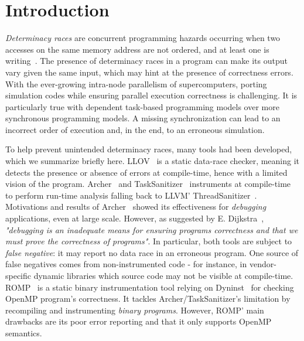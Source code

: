\section{Introduction}


\emph{Determinacy races} are concurrent programming hazards occurring when two accesses on the same memory address are not ordered, and at least one is writing~\cite{determinator}.
The presence of determinacy races in a program can make its output vary given the same input, which may hint at the presence of correctness errors.
With the ever-growing intra-node parallelism of supercomputers, porting simulation codes while ensuring parallel execution correctness is challenging.
It is particularly true with dependent task-based programming models over more synchronous programming models.
A missing synchronization can lead to an incorrect order of execution and, in the end, to an erroneous simulation.

To help prevent unintended determinacy races, many tools had been developed, which we summarize briefly here.
LLOV~\cite{LLOV} is a static data-race checker, meaning it detects the presence or absence of errors at compile-time, hence with a limited vision of the program.
Archer~\cite{archer} and TaskSanitizer~\cite{Matar18} instruments at compile-time to perform run-time analysis falling back to LLVM' ThreadSanitizer~\cite{thread-sanitizer-llvm}.
Motivations and results of Archer~\cite{archer} showed its effectiveness for \emph{debugging} applications, even at large scale.
However, as suggested by E. Dijkstra~\cite{EWD303}, \emph{"debugging is an inadequate means for ensuring programs correctness and that we must prove the correctness of programs"}.
In particular, both tools are subject to \emph{false negative}: it may report no data race in an erroneous program. 
One source of false negatives comes from non-instrumented code - for instance, in vendor-specific dynamic libraries which source code may not be visible at compile-time.
ROMP~\cite{ROMP} is a static binary instrumentation tool relying on Dyninst~\cite{dyninstr} for checking OpenMP program's correctness.
It tackles Archer/TaskSanitizer's limitation by recompiling and instrumenting \emph{binary programs}.
However, ROMP' main drawbacks are its poor error reporting and that it only supports OpenMP semantics.

